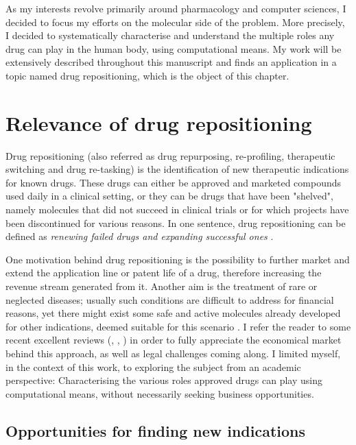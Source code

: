 As my interests revolve primarily around pharmacology and computer sciences, I decided to focus my efforts on the molecular side of the problem. More precisely, I decided to systematically characterise and understand the multiple roles any drug can play in the human body, using computational means. My work will be extensively described throughout this manuscript and finds an application in a topic named drug repositioning, which is the object of this chapter.

\section{Relevance of drug repositioning}

Drug repositioning (also referred as drug repurposing, re-profiling, therapeutic switching and drug re-tasking) is the identification of new therapeutic indications for known drugs. These drugs can either be approved and marketed compounds used daily in a clinical setting, or they can be drugs that have been "shelved", namely molecules that did not succeed in clinical trials or for which projects have been discontinued for various reasons. In one sentence, drug repositioning can be defined as \emph{renewing failed drugs and expanding successful ones} \citep{barratt2012drug}.

One motivation behind drug repositioning is the possibility to further market and extend the application line or patent life of a drug, therefore increasing the revenue stream generated from it. Another aim is the treatment of rare or neglected diseases; usually such conditions are difficult to address for financial reasons, yet there might exist some safe and active molecules already developed for other indications, deemed suitable for this scenario \citep{men20101}. I refer the reader to some recent excellent reviews (\cite{ashburn2004drug}, \cite{dudley2011exploiting}, \cite{hurle2013computational}) in order to fully appreciate the economical market behind this approach, as well as legal challenges coming along. I limited myself, in the context of this work, to exploring the subject from an academic perspective: Characterising the various roles approved drugs can play using computational means, without necessarily seeking business opportunities.

\subsection{Opportunities for finding new indications}
\label{sec:opp}

